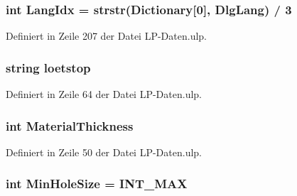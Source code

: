 \hypertarget{_l_p-_daten_8ulp_a82c4a8df95cb51da553d4645b2de79d0}{}
\subsubsection[{Lang\+Idx}]{\setlength{\rightskip}{0pt plus 5cm}int Lang\+Idx = strstr({\bf Dictionary}\mbox{[}0\mbox{]}, {\bf Dlg\+Lang}) / 3}\label{_l_p-_daten_8ulp_a82c4a8df95cb51da553d4645b2de79d0}


Definiert in Zeile 207 der Datei L\+P-\/\+Daten.\+ulp.

\hypertarget{_l_p-_daten_8ulp_a0896ff121ea65c7d3f5033c3aa45ce86}{}
\subsubsection[{loetstop}]{\setlength{\rightskip}{0pt plus 5cm}string loetstop}\label{_l_p-_daten_8ulp_a0896ff121ea65c7d3f5033c3aa45ce86}


Definiert in Zeile 64 der Datei L\+P-\/\+Daten.\+ulp.

\hypertarget{_l_p-_daten_8ulp_a1edf6e298013c81bc3b0c06503341a9e}{}
\subsubsection[{Material\+Thickness}]{\setlength{\rightskip}{0pt plus 5cm}int Material\+Thickness}\label{_l_p-_daten_8ulp_a1edf6e298013c81bc3b0c06503341a9e}


Definiert in Zeile 50 der Datei L\+P-\/\+Daten.\+ulp.

\hypertarget{_l_p-_daten_8ulp_afd98e8c3d97718929a30d66e4c2600ea}{}
\subsubsection[{Min\+Hole\+Size}]{\setlength{\rightskip}{0pt plus 5cm}int Min\+Hole\+Size = I\+N\+T\+\_\+\+M\+A\+X}\label{_l_p-_daten_8ulp_afd98e8c3d97718929a30d66e4c2600ea}


